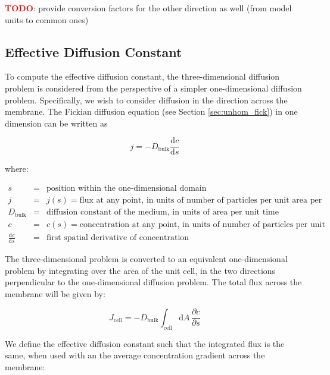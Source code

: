 \textcolor{red}{\textbf{TODO}}: provide conversion factors for the other direction as well (from model units to common ones)

\subsection{Effective Diffusion Constant}\label{subsec:D_eff}

To compute the effective diffusion constant,
the three-dimensional diffusion problem is considered from the perspective of a simpler one-dimensional diffusion problem.
Specifically, we wish to consider diffusion in the direction across the membrane.
The Fickian diffusion equation (see Section \ref{sec:unhom_fick}) in one dimension can be written as

\begin{equation}\label{eq:fickslaw_1D}
j = - D_{\mathrm{bulk}} \frac{\mathrm{d}c}{\mathrm{d}s}
\end{equation}

where:

$\begin{array}{rcl}
s & = & \text{position within the one-dimensional domain} \\
j & = & j(s) = \text{flux at any point, in units of number of particles per unit area per unit time} \\
D_{\text{bulk}} & = & \text{diffusion constant of the medium, in units of area per unit time} \\
c & = & c(s) = \text{concentration at any point, in units of number of particles per unit volume} \\
\frac{\mathrm{d}c}{\mathrm{d}s} & = & \text{first spatial derivative of concentration}
\end{array}$

The three-dimensional problem is converted to an equivalent one-dimensional problem
by integrating over the area of the unit cell, in the two directions perpendicular to
the one-dimensional diffusion problem.
The total flux across the membrane will be given by:

\begin{equation}
J_{\mathrm{cell}} = - D_{\mathrm{bulk}}\int_{\mathrm{cell}} \mathrm{d}A\, \frac{\partial c}{\partial s}
\end{equation}

We define the effective diffusion constant such that the integrated flux is the same,
when used with an the average concentration gradient across the membrane:

